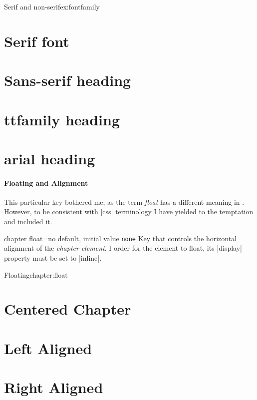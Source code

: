 \begin{texexample}{Serif and non-serif}{ex:fontfamily}
\chapter{Serif font}
\lorem
{}
\chapter{Sans-serif heading}
\lorem
{}
\chapter{ttfamily heading}
\lorem
{}
\chapter{arial heading}
\lorem
\end{texexample}


\subsubsection{Floating and Alignment} 

This particular key bothered me, as the term \emph{float} has a different meaning in \latexe. However, to
be consistent with |css| terminology I have yielded to the temptation and included it.

\begin{docKey}[]{chapter float}{=}{no default, initial value \texttt{none}}
Key that controls the horizontal alignment of the \emph{chapter element}. I order for the
element to float, its |display| property must be set to |inline|.
\end{docKey}

\begin{texexample}{Floating}{chapter:float}
\chapter{Centered Chapter}
\lorem
{}
\chapter{Left Aligned}
\lorem
{}
\chapter{Right Aligned}
\lorem
\end{texexample}


